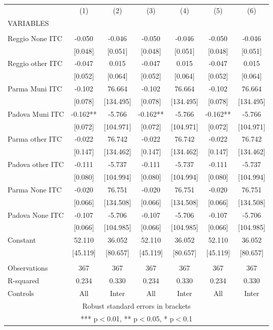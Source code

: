\begin{tabular}{lcccccc} \hline
 & (1) & (2) & (3) & (4) & (5) & (6) \\
VARIABLES &  &  &  &  &  &  \\ \hline
 &  &  &  &  &  &  \\
Reggio None ITC & -0.050 & -0.046 & -0.050 & -0.046 & -0.050 & -0.046 \\
 & [0.048] & [0.051] & [0.048] & [0.051] & [0.048] & [0.051] \\
Reggio other ITC & -0.047 & 0.015 & -0.047 & 0.015 & -0.047 & 0.015 \\
 & [0.052] & [0.064] & [0.052] & [0.064] & [0.052] & [0.064] \\
Parma Muni ITC & -0.102 & 76.664 & -0.102 & 76.664 & -0.102 & 76.664 \\
 & [0.078] & [134.495] & [0.078] & [134.495] & [0.078] & [134.495] \\
Padova Muni ITC & -0.162** & -5.766 & -0.162** & -5.766 & -0.162** & -5.766 \\
 & [0.072] & [104.971] & [0.072] & [104.971] & [0.072] & [104.971] \\
Parma other ITC & -0.022 & 76.742 & -0.022 & 76.742 & -0.022 & 76.742 \\
 & [0.147] & [134.462] & [0.147] & [134.462] & [0.147] & [134.462] \\
Padova other ITC & -0.111 & -5.737 & -0.111 & -5.737 & -0.111 & -5.737 \\
 & [0.080] & [104.994] & [0.080] & [104.994] & [0.080] & [104.994] \\
Parma None ITC & -0.020 & 76.751 & -0.020 & 76.751 & -0.020 & 76.751 \\
 & [0.066] & [134.508] & [0.066] & [134.508] & [0.066] & [134.508] \\
Padova None ITC & -0.107 & -5.706 & -0.107 & -5.706 & -0.107 & -5.706 \\
 & [0.066] & [104.985] & [0.066] & [104.985] & [0.066] & [104.985] \\
Constant & 52.110 & 36.052 & 52.110 & 36.052 & 52.110 & 36.052 \\
 & [45.119] & [80.657] & [45.119] & [80.657] & [45.119] & [80.657] \\
 &  &  &  &  &  &  \\
Observations & 367 & 367 & 367 & 367 & 367 & 367 \\
R-squared & 0.234 & 0.330 & 0.234 & 0.330 & 0.234 & 0.330 \\
 Controls & All & Inter & All & Inter & All & Inter \\ \hline
\multicolumn{7}{c}{ Robust standard errors in brackets} \\
\multicolumn{7}{c}{ *** p$<$0.01, ** p$<$0.05, * p$<$0.1} \\
\end{tabular}
